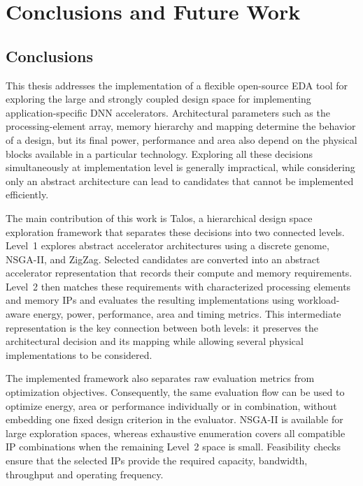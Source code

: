 \clearpage
\section{Conclusions and Future Work}

\subsection{Conclusions}

This thesis addresses the implementation of a flexible open-source EDA
tool for exploring the large and
strongly coupled design space for implementing application-specific
DNN accelerators. Architectural
parameters such as the processing-element array, memory hierarchy and
mapping determine the behavior of a design, but its final power,
performance and area also depend on the physical blocks available in a
particular technology. Exploring all these decisions simultaneously at
implementation level is generally impractical, while considering only
an abstract architecture can lead to candidates that cannot be
implemented efficiently.

The main contribution of this work is Talos, a hierarchical design
space exploration framework that separates these decisions into two
connected levels. Level~1 explores abstract accelerator architectures
using a discrete genome, NSGA-II, and ZigZag. Selected candidates are
converted into an abstract accelerator representation that records
their compute and memory requirements. Level~2 then matches these
requirements with characterized processing elements and memory IPs and
evaluates the resulting implementations using workload-aware energy,
power, performance, area and timing metrics. This intermediate
representation is the key connection between both levels: it preserves
the architectural decision and its mapping while allowing several
physical implementations to be considered.

The implemented framework also separates raw evaluation metrics from
optimization objectives. Consequently, the same evaluation flow can
be used to optimize energy, area or performance individually or in
combination, without embedding one fixed design criterion in the
evaluator. NSGA-II is available for large exploration spaces, whereas
exhaustive enumeration covers all compatible IP combinations when the
remaining Level~2 space is small. Feasibility checks ensure that the
selected IPs provide the required capacity, bandwidth, throughput and
operating frequency.

